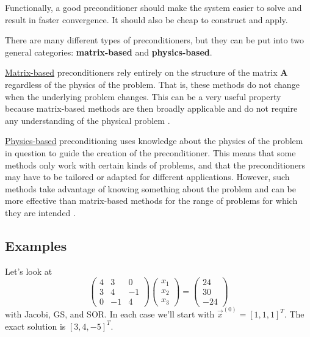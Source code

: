 \documentclass[12pt]{article}
\newcommand{\ve}[1]{\ensuremath{\mathbf{#1}}}
\begin{document}
Functionally, a good preconditioner should make the system easier to solve and result in faster convergence. It should also be cheap to construct and apply. %

There are many different types of preconditioners, but they can be put into two general categories: \textbf{matrix-based} and \textbf{physics-based}.

\underline{Matrix-based} preconditioners rely entirely on the structure of the matrix $\ve{A}$ regardless of the physics of the problem. That is, these methods do not change when the underlying problem changes. This can be a very useful property because matrix-based methods are then broadly applicable and do not require any understanding of the physical problem \cite{Trefethen1997}. %

\underline{Physics-based} preconditioning uses knowledge about the physics of the problem in question to guide the creation of the preconditioner. This means that some methods only work with certain kinds of problems, and that the preconditioners may have to be tailored or adapted for different applications. However, such methods take advantage of knowing something about the problem and can be more effective than matrix-based methods for the range of problems for which they are intended \cite{Trefethen1997}. %


\clearpage
\subsection*{Examples}

Let's look at 
%
\begin{equation}
\begin{pmatrix}
  4  &  3 & 0 \\
  3  &  4 & -1 \\
  0  & -1 & 4
\end{pmatrix}
%
\begin{pmatrix} x_1 \\ x_2 \\ x_3 \end{pmatrix} 
%
= \begin{pmatrix} 24 \\ 30 \\ -24 \end{pmatrix} \nonumber
\end{equation}
%
with Jacobi, GS, and SOR. In each case we'll start with $\vec{x}^{(0)} = [1, 1, 1]^T$. The exact solution is $[3, 4, -5]^T$. 
\end{document}
